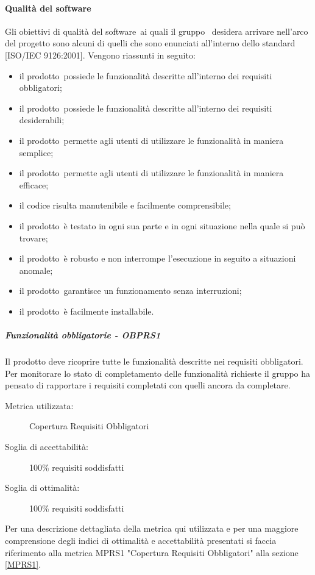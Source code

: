 \documentclass[../PianoDiQualifica.tex]{subfiles}
\begin{document}
			\paragraph{Qualità del software}
			Gli obiettivi di qualità del software\g\ ai quali il gruppo \leaf\ desidera arrivare nell'arco del progetto sono alcuni di quelli che sono enunciati all'interno dello standard [ISO/IEC 9126:2001]. Vengono riassunti in seguito:
		\begin{itemize}
			\item il prodotto\g\ possiede le funzionalità descritte all'interno dei requisiti obbligatori;
			\item il prodotto\g\ possiede le funzionalità descritte all'interno dei requisiti desiderabili;
			\item il prodotto\g\ permette agli utenti di utilizzare le funzionalità in maniera semplice;
			\item il prodotto\g\ permette agli utenti di utilizzare le funzionalità in maniera efficace;
			\item il codice risulta manutenibile e facilmente comprensibile;
			\item il prodotto\g\ è testato in ogni sua parte e in ogni situazione nella quale si può trovare;
			\item il prodotto\g\ è robusto e non interrompe l'esecuzione in seguito a situazioni anomale;
			\item il prodotto\g{}arantisce un funzionamento senza interruzioni;
			\item il prodotto\g\ è facilmente installabile.
		\end{itemize}
				\subparagraph{Funzionalità obbligatorie - OBPRS1}
				Il prodotto deve ricoprire tutte le funzionalità descritte nei requisiti obbligatori. Per monitorare lo stato di completamento delle funzionalità richieste il gruppo ha pensato di rapportare i requisiti completati con quelli ancora da completare.
					\begin{description}
						\item [Metrica utilizzata:] Copertura Requisiti Obbligatori
						\item [Soglia di accettabilità:] 100\% requisiti soddisfatti
						\item [Soglia di ottimalità:] 100\% requisiti soddisfatti
					\end{description}
					Per una descrizione dettagliata della metrica qui utilizzata e per una maggiore comprensione degli indici di ottimalità e accettabilità presentati si faccia riferimento alla metrica MPRS1 "Copertura Requisiti Obbligatori" alla sezione \ref{MPRS1}.
\end{document}

